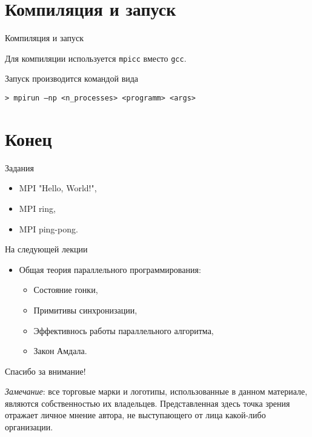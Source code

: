 \section{Компиляция и запуск}

\begin{frame}[fragile]{Компиляция и запуск}

Для компиляции используется \texttt{mpicc} вместо \texttt{gcc}.

\vfill

Запуск производится командой вида

\begin{lstlisting}
> mpirun –np <n_processes> <programm> <args>
\end{lstlisting}

\end{frame}

\section*{Конец}

\begin{frame}{Задания}

\begin{itemize}
    \item MPI "Hello, World!",
    \item MPI ring,
    \item MPI ping-pong.
\end{itemize}

\end{frame}

\begin{frame}{На следующей лекции}

\begin{itemize}
    \item Общая теория параллельного программирования:
    \begin{itemize}
        \item Состояние гонки,
        \item Примитивы синхронизации,
        \item Эффективнось работы параллельного алгоритма,
        \item Закон Амдала.
    \end{itemize}
\end{itemize}

\end{frame}

\begin{frame}

{\huge{Спасибо за внимание!}\par}

\vfill

\tiny{\textit{Замечание}: все торговые марки и логотипы, использованные в данном материале, являются собственностью их владельцев. Представленная здесь точка зрения отражает личное мнение автора, не выступающего от лица какой-либо организации.}

\end{frame}


